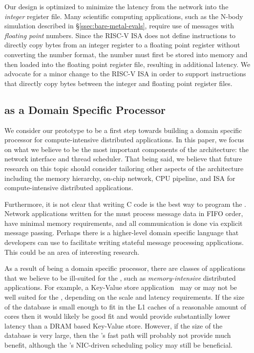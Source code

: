 Our \name{} design is optimized to minimize the latency from the network into the \emph{integer} register file.
Many scientific computing applications, such as the N-body simulation described in \S\ref{ssec:bare-metal-evals}, require use of messages with \emph{floating point} numbers.
Since the RISC-V ISA does not define instructions to directly copy bytes from an integer register to a floating point register without converting the number format, the number must first be stored into memory and then loaded into the floating point register file, resulting in additional latency.
We advocate for a minor change to the RISC-V ISA in order to support instructions that directly copy bytes between the integer and floating point register files.

\subsection{\name{} as a Domain Specific Processor}
We consider our \name{} prototype to be a first step towards building a domain specific processor for compute-intensive distributed applications.
In this paper, we focus on what we believe to be the most important components of the architecture: the network interface and thread scheduler.
That being said, we believe that future research on this topic should consider tailoring other aspects of the architecture including the memory hierarchy, on-chip network, CPU pipeline, and ISA for compute-intensive distributed applications.

Furthermore, it is not clear that writing C code is the best way to program the \name{}. Network applications written for the \name{} must process message data in FIFO order, have minimal memory requirements, and all communication is done via explicit message passing.
Perhaps there is a higher-level domain specific language that developers can use to facilitate writing stateful message processing applications. This could be an area of interesting research.

As a result of being a domain specific processor, there are classes of applications that we believe to be ill-suited for the \name{}, such as \emph{memory-intensive} distributed applications.
For example, a Key-Value store application~\cite{memcached} may or may not be well suited for the \name{}, depending on the scale and latency requirements.
If the size of the database is small enough to fit in the L1 caches of a reasonable amount of \name{} cores then it would likely be good fit and would provide substantially lower latency than a DRAM based Key-Value store.
However, if the size of the database is very large, then the \name{}'s fast path will probably not provide much benefit, although the \name{}'s NIC-driven scheduling policy may still be beneficial.

